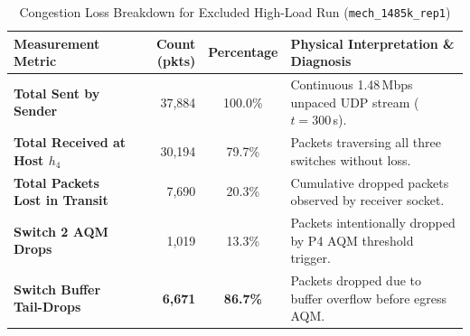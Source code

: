 \begin{table}[H]
\centering
\small
\caption{Congestion Loss Breakdown for Excluded High-Load Run (\texttt{mech\_1485k\_rep1})}
\label{tab:highload_taildrop}
\begin{tabularx}{\textwidth}{lrcX}
\toprule
\textbf{Measurement Metric} & \textbf{Count (pkts)} & \textbf{Percentage} & \textbf{Physical Interpretation \& Diagnosis} \\
\midrule
\textbf{Total Sent by Sender} & 37,884 & 100.0\% & Continuous 1.48\,Mbps unpaced UDP stream ($t=300$\,s). \\
\textbf{Total Received at Host $h_4$} & 30,194 & 79.7\% & Packets traversing all three switches without loss. \\
\textbf{Total Packets Lost in Transit} & 7,690 & 20.3\% & Cumulative dropped packets observed by receiver socket. \\
\midrule
\textbf{Switch 2 AQM Drops} & 1,019 & 13.3\% & Packets intentionally dropped by P4 AQM threshold trigger. \\
\textbf{Switch Buffer Tail-Drops} & \textbf{6,671} & \textbf{86.7\%} & Packets dropped due to buffer overflow before egress AQM. \\
\bottomrule
\end{tabularx}
\end{table}
